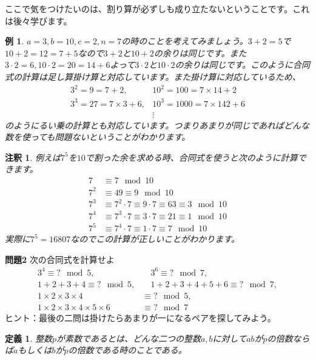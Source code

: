 \documentclass{ltjsarticle}
\newtheorem{definition}{定義}[section]
\newtheorem{remark}{注釈}[section]
\newtheorem{example}{例}[section]
\begin{document}
ここで気をつけたいのは、割り算が必ずしも成り立たないということです。これは後々学びます。

\begin{example}
$a=3,b=10,c=2,n=7$の時のことを考えてみましょう。$3+2 = 5$で$10+2=12 = 7 +5$なので$3+2$と$10+2$の余りは同じです。また$3\cdot2=6,10\cdot 2 = 20 = 14+6$よって$3\cdot 2$と$10\cdot2$の余りは同じです。このように合同式の計算は足し算掛け算と対応しています。また掛け算に対応しているため、
\begin{align*}
3^2 =9=7+2, & 10^2=100 = 7\times 14+2\\
3^3 =27=7\times 3+6, & 10^3=1000 = 7\times 142+6\\
&\vdots
\end{align*}
のようにるい乗の計算とも対応しています。つまりあまりが同じであればどんな数を使っても問題ないということがわかります。
\end{example}

\begin{remark}
例えば$7^5$を$10$で割った余を求める時、合同式を使うと次のように計算できます。
\begin{align*}
7 &\equiv 7 \mod{10}\\
7^2 &\equiv 49 \equiv 9 \mod{10}\\
7^3 &\equiv 7^2 \cdot 7\equiv 9\cdot 7 \equiv 63 \equiv 3\mod{10}\\
7^4 & \equiv 7^3\cdot 7 \equiv 3\cdot 7 \equiv 21 \equiv 1\mod{10}\\
7^5 & \equiv 7^4\cdot 7 \equiv 1 \cdot 7 \equiv 7\mod{10}
\end{align*}
実際に$7^5 = 16807$なのでこの計算が正しいことがわかります。
\end{remark}

\par\textbf{問題2}
次の合同式を計算せよ
\begin{align*}
3^4 \equiv?\mod{5},&\quad3^6 \equiv?\mod{7},\\
1+2+3+4 \equiv?\mod{5},&\quad1+2+3+4+5+6 \equiv?\mod{7},\\
1\times 2\times 3\times 4&\equiv?\mod{5},\\
1\times 2\times 3\times 4\times 5\times 6&\equiv?\mod{7}
\end{align*}
ヒント：最後の二問は掛けたらあまりが一になるペアを探してみよう。

\begin{definition}
整数$p$が素数であるとは、どんな二つの整数$a,b$に対して$ab$が$p$の倍数ならば$a$もしくは$b$が$p$の倍数である時のことである。
\end{definition}
\end{document}
